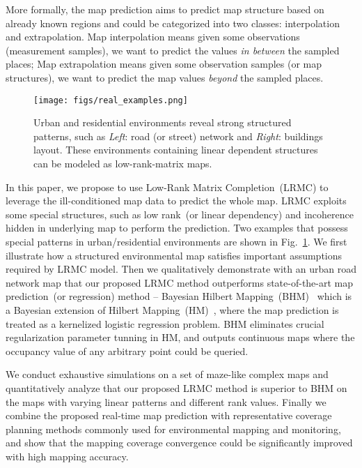 More formally, the map prediction aims to predict map structure based on already known regions and could be categorized into two classes: interpolation and extrapolation. Map interpolation means given some observations (measurement samples), we want to predict the values \textit{in between} the sampled places;
Map extrapolation means given some observation samples (or map structures), we want to predict the map values \textit{beyond} the sampled places. 

\begin{figure} \vspace{5pt}
  \centering
  	{\label{fig:real}\texttt{[image: figs/real\_examples.png]}}
  \caption{\small Urban and residential environments reveal strong structured patterns, such as \textit{Left}: road (or street) network and \textit{Right}: buildings layout. These environments containing linear dependent structures can be modeled as low-rank-matrix maps.} 
\label{fig:real}  
\end{figure}


In this paper, we propose to use Low-Rank Matrix Completion~(LRMC) to leverage the ill-conditioned map data to predict the whole map. LRMC exploits some special structures, such as low rank~(or linear dependency) and incoherence hidden in underlying map to perform the prediction. Two examples that possess special patterns in urban/residential environments are shown in Fig.~\ref{fig:real}.
We first illustrate how a structured environmental map satisfies important assumptions required by LRMC model. Then we qualitatively demonstrate with an urban road network map that our proposed LRMC method outperforms state-of-the-art map prediction~(or regression) method -- Bayesian Hilbert Mapping~(BHM)~\cite{senanayake2017bayesian} which is a Bayesian extension of Hilbert Mapping~(HM)~\cite{ramos2016hilbert}, where the map prediction is treated as a kernelized logistic regression problem. BHM eliminates crucial regularization parameter tunning in HM, and outputs continuous maps where the occupancy value of any arbitrary point could be queried.

We conduct exhaustive simulations on a set of maze-like complex maps and quantitatively analyze that our proposed LRMC method is superior to BHM on the maps with varying linear patterns and different rank values. %
Finally we combine the proposed real-time map prediction with representative coverage planning methods commonly used for environmental mapping and monitoring, and show that the mapping coverage convergence could be significantly improved with high mapping accuracy. 

